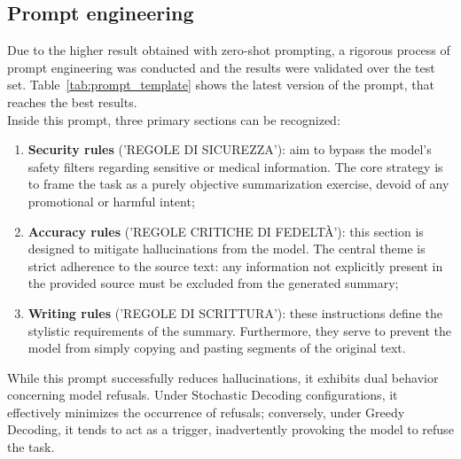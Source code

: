 \documentclass[conference]{IEEEtran}
\begin{document}
\subsection{Prompt engineering}
Due to the higher result obtained with zero-shot prompting, a rigorous process of prompt engineering was conducted and the results were validated over the test set. Table~\ref{tab:prompt_template} shows the latest version of the prompt, that reaches the best results.\\
Inside this prompt, three primary sections can be recognized:
\begin{enumerate}
    \item \textbf{Security rules} ('REGOLE DI SICUREZZA'): aim to bypass the model's safety filters regarding sensitive or medical information. The core strategy is to frame the task as a purely objective summarization exercise, devoid of any promotional or harmful intent;
    \item  \textbf{Accuracy rules} ('REGOLE CRITICHE DI FEDELTÀ'): this section is designed to mitigate hallucinations from the model. The central theme is strict adherence to the source text: any information not explicitly present in the provided source must be excluded from the generated summary;
    \item \textbf{Writing rules} ('REGOLE DI SCRITTURA'): these instructions define the stylistic requirements of the summary. Furthermore, they serve to prevent the model from simply copying and pasting segments of the original text.
\end{enumerate}
While this prompt successfully reduces hallucinations, it exhibits dual behavior concerning model refusals. Under Stochastic Decoding configurations, it effectively minimizes the occurrence of refusals; conversely, under Greedy Decoding, it tends to act as a trigger, inadvertently provoking the model to refuse the task.
\end{document}

